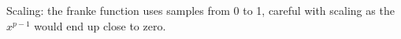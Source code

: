 Scaling: the franke function uses samples from 0 to 1, careful with scaling as the $x^{p-1}$ would end up close to zero. 